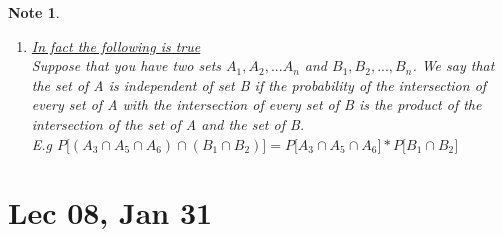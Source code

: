 \documentclass[11pt]{article}
\newtheorem*{note}{Note}
\begin{document}
\begin{note}
\begin{enumerate}
\begin{enumerate}
\begin{proof}
\begin{align*}
                                                \intertext{Hence}
                                                P(A^c \cap B^c) &= P(A^c)P(B^c)
                                            \end{align*}
                                        \end{proof}
                            \end{enumerate}
                    \item \underline{In fact the following is true}\\
                    Suppose that you have two sets $A_1,A_2,...A_n$ and $B_1,B_2,..., B_n$. 
                    We say that the set of A is independent of set B if the probability of the intersection of every set of A with the intersection of every set of B 
                    is the product of the intersection of the set of A and the set of B.\\
                    E.g $P\Big[(A_3 \cap A_5 \cap A_6 ) \cap (B_1 \cap B_2)\Big] = P\Big[A_3 \cap A_5 \cap A_6\Big]* P\Big[B_1 \cap B_2\Big]$
                \end{enumerate}
            \end{note}
            \newpage
    
    \section{Lec 08, Jan 31}
\end{document}
